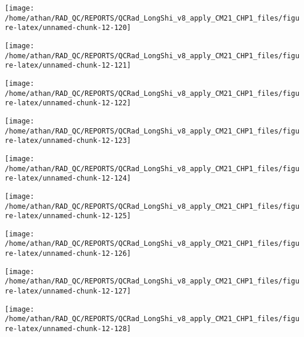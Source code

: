 \documentclass[
  10pt,
  a4paper,oneside]{article}
\begin{document}
\begin{center}\texttt{[image: /home/athan/RAD\_QC/REPORTS/QCRad\_LongShi\_v8\_apply\_CM21\_CHP1\_files/figure-latex/unnamed-chunk-12-120]} \end{center}

\begin{center}\texttt{[image: /home/athan/RAD\_QC/REPORTS/QCRad\_LongShi\_v8\_apply\_CM21\_CHP1\_files/figure-latex/unnamed-chunk-12-121]} \end{center}

\begin{center}\texttt{[image: /home/athan/RAD\_QC/REPORTS/QCRad\_LongShi\_v8\_apply\_CM21\_CHP1\_files/figure-latex/unnamed-chunk-12-122]} \end{center}

\begin{center}\texttt{[image: /home/athan/RAD\_QC/REPORTS/QCRad\_LongShi\_v8\_apply\_CM21\_CHP1\_files/figure-latex/unnamed-chunk-12-123]} \end{center}

\begin{center}\texttt{[image: /home/athan/RAD\_QC/REPORTS/QCRad\_LongShi\_v8\_apply\_CM21\_CHP1\_files/figure-latex/unnamed-chunk-12-124]} \end{center}

\begin{center}\texttt{[image: /home/athan/RAD\_QC/REPORTS/QCRad\_LongShi\_v8\_apply\_CM21\_CHP1\_files/figure-latex/unnamed-chunk-12-125]} \end{center}

\begin{center}\texttt{[image: /home/athan/RAD\_QC/REPORTS/QCRad\_LongShi\_v8\_apply\_CM21\_CHP1\_files/figure-latex/unnamed-chunk-12-126]} \end{center}

\begin{center}\texttt{[image: /home/athan/RAD\_QC/REPORTS/QCRad\_LongShi\_v8\_apply\_CM21\_CHP1\_files/figure-latex/unnamed-chunk-12-127]} \end{center}

\begin{center}\texttt{[image: /home/athan/RAD\_QC/REPORTS/QCRad\_LongShi\_v8\_apply\_CM21\_CHP1\_files/figure-latex/unnamed-chunk-12-128]} \end{center}
\end{document}
